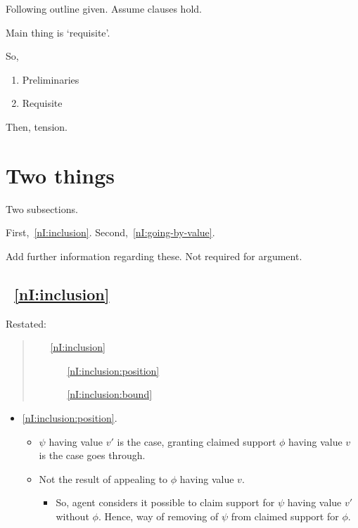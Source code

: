 \begin{note}
  Following outline given.
  Assume clauses hold.

  Main thing is `requisite'.

  So,
  \begin{enumerate}
  \item Preliminaries
  \item Requisite
  \end{enumerate}
  Then, tension.
\end{note}

\section{Two things}
\label{sec:nI:arg:clauses}

\begin{note}
  Two subsections.

  First,~\ref{nI:inclusion}.
  Second,~\ref{nI:going-by-value}.

  Add further information regarding these.
  Not required for argument.
\end{note}

\subsection{~\ref{nI:inclusion}}

\begin{note}[\ref{nI:inclusion}]
  Restated:
  \begin{quote}
    \begin{enumerate}
    \item[\ref{nI:inclusion}]
      \nIClauseInclusion{}
      \begin{enumerate}
      \item[\ref{nI:inclusion:position}] \nIClauseInclusionPosition{}
      \item[\ref{nI:inclusion:bound}] \nIClauseInclusioBound{}
      \end{enumerate}
    \end{enumerate}
  \end{quote}
\end{note}

\begin{note}
  \begin{itemize}
  \item \ref{nI:inclusion:position}.
    \begin{itemize}
    \item \(\psi\) having value \(v'\) is the case, granting claimed support \(\phi\) having value \(v\) is the case goes through.
    \item Not the result of appealing to \(\phi\) having value \(v\).
      \begin{itemize}
      \item So, agent considers it possible to claim support for \(\psi\) having value \(v'\) without \(\phi\).
        Hence, way of removing \expec{} of \(\psi\) from claimed support for \(\phi\).
      \end{itemize}
    \end{itemize}
  \end{itemize}
\end{note}

